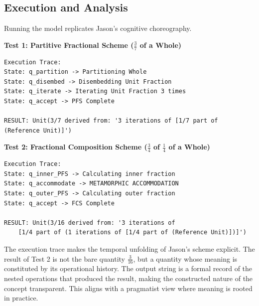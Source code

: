\documentclass[12pt]{book}
\begin{document}
\subsection{Execution and Analysis}
Running the model replicates Jason's cognitive choreography. 

\textbf{Test 1: Partitive Fractional Scheme ($\frac{3}{7}$ of a Whole)}
\begin{verbatim}
Execution Trace:
State: q_partition -> Partitioning Whole
State: q_disembed -> Disembedding Unit Fraction
State: q_iterate -> Iterating Unit Fraction 3 times
State: q_accept -> PFS Complete

RESULT: Unit(3/7 derived from: '3 iterations of [1/7 part of (Reference Unit)]')
\end{verbatim}

\textbf{Test 2: Fractional Composition Scheme ($\frac{3}{4}$ of $\frac{1}{4}$ of a Whole)}
\begin{verbatim}
Execution Trace:
State: q_inner_PFS -> Calculating inner fraction
State: q_accommodate -> METAMORPHIC ACCOMMODATION
State: q_outer_PFS -> Calculating outer fraction
State: q_accept -> FCS Complete

RESULT: Unit(3/16 derived from: '3 iterations of 
    [1/4 part of (1 iterations of [1/4 part of (Reference Unit)])]')
\end{verbatim}
The execution trace makes the temporal unfolding of Jason's scheme explicit. The result of Test 2 is not the bare quantity $\frac{3}{16}$, but a quantity whose meaning is constituted by its operational history. The output string is a formal record of the nested operations that produced the result, making the constructed nature of the concept transparent. This aligns with a pragmatist view where meaning is rooted in practice.
\end{document}
